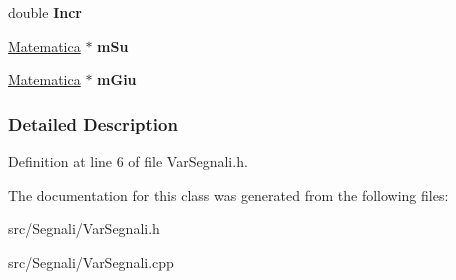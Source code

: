 \begin{DoxyCompactItemize}
\item 
double {\bfseries Incr}\hypertarget{classVariabili_a891315d4365f283061bc7d4a1531df91}{}\label{classVariabili_a891315d4365f283061bc7d4a1531df91}

\item 
\hyperlink{classMatematica}{Matematica} $\ast$ {\bfseries m\+Su}\hypertarget{classVariabili_a9183b9e0d8b2ca559115ab7997093855}{}\label{classVariabili_a9183b9e0d8b2ca559115ab7997093855}

\item 
\hyperlink{classMatematica}{Matematica} $\ast$ {\bfseries m\+Giu}\hypertarget{classVariabili_a2fbe4148b757ff50a40c170610e1fd94}{}\label{classVariabili_a2fbe4148b757ff50a40c170610e1fd94}

\end{DoxyCompactItemize}


\subsubsection{Detailed Description}


Definition at line 6 of file Var\+Segnali.\+h.



The documentation for this class was generated from the following files\+:\begin{DoxyCompactItemize}
\item 
src/\+Segnali/Var\+Segnali.\+h\item 
src/\+Segnali/Var\+Segnali.\+cpp\end{DoxyCompactItemize}

